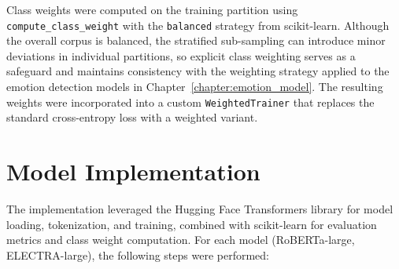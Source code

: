 Class weights were computed on the training partition using \texttt{compute\_class\_weight} with the \texttt{balanced} strategy from scikit-learn. Although the overall corpus is balanced, the stratified sub-sampling can introduce minor deviations in individual partitions, so explicit class weighting serves as a safeguard and maintains consistency with the weighting strategy applied to the emotion detection models in Chapter~\ref{chapter:emotion_model}. The resulting weights were incorporated into a custom \texttt{WeightedTrainer} that replaces the standard cross-entropy loss with a weighted variant.

\section{Model Implementation}
The implementation leveraged the Hugging Face Transformers library \cite{wolf2020transformers} for model loading, tokenization, and training, combined with scikit-learn \cite{pedregosa2011scikit} for evaluation metrics and class weight computation. For each model (\acs{RoBERTa}-large, \acs{ELECTRA}-large), the following steps were performed:

